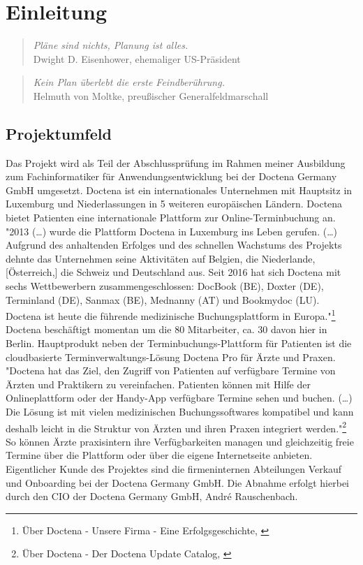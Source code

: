 \section{Einleitung}
\label{sec:Einleitung}
\begin{quote}
\textit{Pläne sind nichts, Planung ist alles.}\\
Dwight D. Eisenhower, ehemaliger US-Präsident
\end{quote}
\begin{quote}
\textit{Kein Plan überlebt die erste Feindberührung.}\\
Helmuth von Moltke, preußischer Generalfeldmarschall
\end{quote}

\subsection{Projektumfeld} 
\label{sec:Projektumfeld}
Das Projekt wird als Teil der Abschlussprüfung im Rahmen meiner Ausbildung zum Fachinformatiker für Anwendungsentwicklung bei der Doctena Germany GmbH umgesetzt. Doctena ist ein internationales Unternehmen mit Hauptsitz in Luxemburg und Niederlassungen in 5 weiteren europäischen Ländern. Doctena bietet Patienten eine internationale Plattform zur Online-Terminbuchung an. "2013 (\dots) wurde die Plattform Doctena in Luxemburg ins Leben gerufen. (\dots) Aufgrund des anhaltenden Erfolges und des schnellen Wachstums des Projekts dehnte das Unternehmen seine Aktivitäten auf Belgien, die Niederlande, [Österreich,] die Schweiz und Deutschland aus. Seit 2016 hat sich Doctena mit sechs Wettbewerbern zusammengeschlossen: DocBook (BE), Doxter (DE), Terminland (DE), Sanmax (BE), Mednanny (AT) und Bookmydoc (LU). Doctena ist heute die führende medizinische Buchungsplattform in Europa."\footnote{Über Doctena - Unsere Firma - Eine Erfolgsgeschichte, \cite{wwwDoctenaComOne}} Doctena beschäftigt momentan um die 80 Mitarbeiter, ca. 30 davon hier in Berlin. Hauptprodukt neben der Terminbuchungs-Plattform für Patienten ist die cloudbasierte Terminverwaltungs-Lösung Doctena Pro für Ärzte und Praxen. "Doctena hat das Ziel, den Zugriff von Patienten auf verfügbare Termine von Ärzten und Praktikern zu vereinfachen. Patienten können mit Hilfe der Onlineplattform oder der Handy-App verfügbare Termine sehen und buchen. (\dots) Die Lösung ist mit vielen medizinischen Buchungssoftwares kompatibel und kann deshalb leicht in die Struktur von Ärzten und ihren Praxen integriert werden."\footnote{Über Doctena - Der Doctena Update Catalog, \cite{wwwDoctenaComTwo}} So können Ärzte praxisintern ihre Verfügbarkeiten managen und gleichzeitig freie Termine über die Plattform oder über die eigene Internetseite anbieten.
Eigentlicher Kunde des Projektes sind die firmeninternen Abteilungen Verkauf und Onboarding bei der Doctena Germany GmbH. Die Abnahme erfolgt hierbei durch den CIO der Doctena Germany GmbH, André Rauschenbach.

